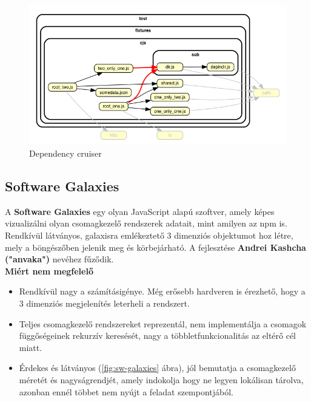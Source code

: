 	\begin{flushright}
		\cite{dep-cruise}
	\end{flushright}
	
	\begin{figure}[h]
		\centering
		\includegraphics[scale=0.4]{images/dep_cruiser.png}
		\caption{Dependency cruiser}
		\label{fig:dep-cruiser}
	\end{figure}
	
	\subsection{Software Galaxies}
	
	A \textbf{Software Galaxies} egy olyan JavaScript alapú szoftver, amely képes vizualizálni olyan csomagkezelő rendszerek adatait, mint amilyen az npm is. Rendkívül látványos, galaxisra emlékeztető 3 dimenziós objektumot hoz létre, mely a böngészőben jelenik meg és körbejárható. A fejlesztése \textbf{Andrei Kashcha ("anvaka")} nevéhez fűződik.\\
	
	
	\textbf{Miért nem megfelelő}
	\begin{itemize}
		\item Rendkívül nagy a számításigénye. Még erősebb hardveren is érezhető, hogy a 3 dimenziós megjelenítés leterheli a rendszert.
		\item Teljes csomagkezelő rendszereket reprezentál, nem implementálja a csomagok függőségeinek rekurzív keresését, nagy a többletfunkcionalitás az eltérő cél miatt.
		\item Érdekes és látványos (\ref{fig:sw-galaxies} ábra), jól bemutatja a csomagkezelő méretét és nagyságrendjét, amely indokolja hogy ne legyen lokálisan tárolva, azonban ennél többet nem nyújt a feladat szempontjából.
	\end{itemize}
	
